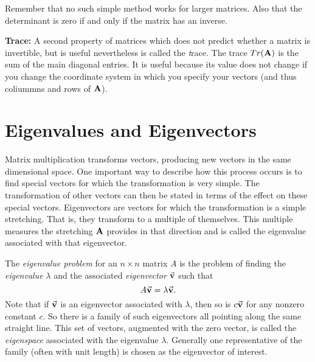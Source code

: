 Remember that no such simple method works for larger matrices.  Also that
the determinant is zero if and only if the matrix has an inverse.

\medskip
\noindent
{\bf Trace:}
A second property of matrices which does not predict whether a matrix is invertible, but
is useful nevertheless is called the {\emph trace}.  The trace $Tr{\left( {{\textbf{A}}} \right)}$ is the sum of
the main diagonal entries.  It is useful because its value does not change if you change
the coordinate system in which you specify your vectors (and thus coliummns and rows of ${\textbf{A}}$).

%
\section{Eigenvalues and Eigenvectors}
%
Matrix multiplication transforms vectors, producing new vectors in the 
same dimensional space.  
One important way to describe how this process occurs is to find special
vectors for which the transformation is very simple.  The transformation of
other vectors can then be stated in terms of the effect on these special
vectors.  Eigenvectors are vectors for which the transformation is a simple
stretching.  That is, they transform to a multiple of themselves.  This multiple
measures the stretching ${\textbf{A}}$ provides in that direction and is called the
eigenvalue associated with that eigenvector.

The \emph{eigenvalue problem}
for an $n \times n$ matrix $A$
is the problem of finding the \emph{eigenvalue} $\lambda$ and the associated 
\emph{eigenvector} $\vec{\textbf{v}}$ such that
\begin{equation}
    A\vec{\textbf{v}} = \lambda \vec{\textbf{v}}.
    \label{eqn:EIGVALPROB}
\end{equation}
Note that if $\vec{\textbf{v}}$ is an eigenvector associated with
$\lambda$, then so is $c\vec{\textbf{v}}$ for any nonzero constant $c$.
So there is a family of such eigenvectors all pointing along
the same straight line.  This set of vectors, augmented with the zero
vector, is called the \emph{eigenspace}
associated with the eigenvalue $\lambda$.  Generally one
representative of the family (often with unit length) is
chosen as the eigenvector of interest.

